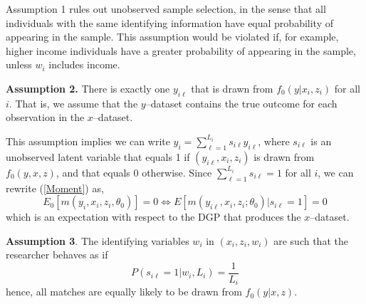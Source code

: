 \documentclass[12pt]{article}
\begin{document}
Assumption 1 rules out unobserved sample selection, in the sense that all individuals with the same identifying information have equal probability of appearing in the sample.  This assumption would be violated if, for example, higher income individuals have a greater probability of appearing in the sample, unless $w_i$ includes income.   

\textbf{Assumption 2.}  There is exactly one $y_{i\ell}$ that is drawn from $f_0(y | x_i,z_i)$%
for all $i.$ That is, we assume that the  $y$--dataset contains the true outcome for each observation in the $x$--dataset. 

This assumption implies we can write $y_i = \sum_{\ell=1}^{L_i} s_{i\ell} y_{i\ell}$, where%
 $s_{i\ell}$ is an unobserved latent variable that equals 1 if $(y_{i\ell}, x_i, z_i) $ is drawn from $f_0(y,x,z)$, and that equals 0 otherwise.  
Since $\sum_{\ell=1}^{L_i} s_{i\ell} = 1$ for all $i$, we can rewrite (\ref{Moment}) as,
\begin{equation} E_0\left[m(y_i, x_i, z_i, \theta_0 )\right] = 0 \iff %
E\left[m(y_{i\ell},x_i,z_i; \theta_0) | s_{i\ell} =1 \right] = 0  \label{truemodel} \end{equation} 
which is an expectation with respect to the DGP that produces the $x$--dataset.

\textbf{Assumption 3}. The identifying variables $w_i$ in $(x_i, z_i, w_i)$ are such that the researcher behaves as if
$$P(s_{i\ell}=1 | w_i, L_i) = \frac{1}{L_i}$$ 
hence, all matches are equally likely to be drawn from $f_0(y | x,z)$. 
\end{document}
